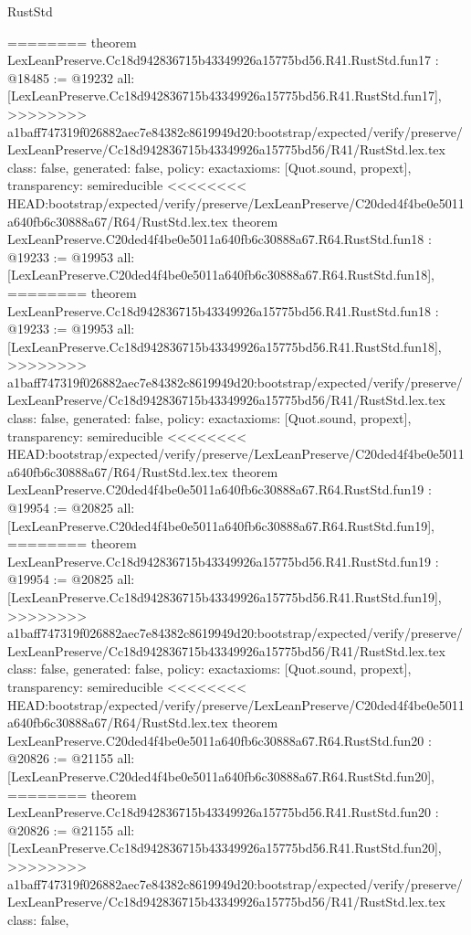 \begin{lexlean}{RustStd}
\begin{coremodule}
{\begin{coremodule}
{{{{{{{{{{{{{{{{{{{{========
theorem LexLeanPreserve.Cc18d942836715b43349926a15775bd56.R41.RustStd.fun17 : @18485 := @19232 {
  all: [LexLeanPreserve.Cc18d942836715b43349926a15775bd56.R41.RustStd.fun17],
>>>>>>>> a1baff747319f026882aec7e84382c8619949d20:bootstrap/expected/verify/preserve/LexLeanPreserve/Cc18d942836715b43349926a15775bd56/R41/RustStd.lex.tex
  class: false,
  generated: false,
  policy: exact{axioms: [Quot.sound, propext]},
  transparency: semireducible
}
<<<<<<<< HEAD:bootstrap/expected/verify/preserve/LexLeanPreserve/C20ded4f4be0e5011a640fb6c30888a67/R64/RustStd.lex.tex
theorem LexLeanPreserve.C20ded4f4be0e5011a640fb6c30888a67.R64.RustStd.fun18 : @19233 := @19953 {
  all: [LexLeanPreserve.C20ded4f4be0e5011a640fb6c30888a67.R64.RustStd.fun18],
========
theorem LexLeanPreserve.Cc18d942836715b43349926a15775bd56.R41.RustStd.fun18 : @19233 := @19953 {
  all: [LexLeanPreserve.Cc18d942836715b43349926a15775bd56.R41.RustStd.fun18],
>>>>>>>> a1baff747319f026882aec7e84382c8619949d20:bootstrap/expected/verify/preserve/LexLeanPreserve/Cc18d942836715b43349926a15775bd56/R41/RustStd.lex.tex
  class: false,
  generated: false,
  policy: exact{axioms: [Quot.sound, propext]},
  transparency: semireducible
}
<<<<<<<< HEAD:bootstrap/expected/verify/preserve/LexLeanPreserve/C20ded4f4be0e5011a640fb6c30888a67/R64/RustStd.lex.tex
theorem LexLeanPreserve.C20ded4f4be0e5011a640fb6c30888a67.R64.RustStd.fun19 : @19954 := @20825 {
  all: [LexLeanPreserve.C20ded4f4be0e5011a640fb6c30888a67.R64.RustStd.fun19],
========
theorem LexLeanPreserve.Cc18d942836715b43349926a15775bd56.R41.RustStd.fun19 : @19954 := @20825 {
  all: [LexLeanPreserve.Cc18d942836715b43349926a15775bd56.R41.RustStd.fun19],
>>>>>>>> a1baff747319f026882aec7e84382c8619949d20:bootstrap/expected/verify/preserve/LexLeanPreserve/Cc18d942836715b43349926a15775bd56/R41/RustStd.lex.tex
  class: false,
  generated: false,
  policy: exact{axioms: [Quot.sound, propext]},
  transparency: semireducible
}
<<<<<<<< HEAD:bootstrap/expected/verify/preserve/LexLeanPreserve/C20ded4f4be0e5011a640fb6c30888a67/R64/RustStd.lex.tex
theorem LexLeanPreserve.C20ded4f4be0e5011a640fb6c30888a67.R64.RustStd.fun20 : @20826 := @21155 {
  all: [LexLeanPreserve.C20ded4f4be0e5011a640fb6c30888a67.R64.RustStd.fun20],
========
theorem LexLeanPreserve.Cc18d942836715b43349926a15775bd56.R41.RustStd.fun20 : @20826 := @21155 {
  all: [LexLeanPreserve.Cc18d942836715b43349926a15775bd56.R41.RustStd.fun20],
>>>>>>>> a1baff747319f026882aec7e84382c8619949d20:bootstrap/expected/verify/preserve/LexLeanPreserve/Cc18d942836715b43349926a15775bd56/R41/RustStd.lex.tex
  class: false,
}}}}}}}}}}}}}}}}}}}}}}}}
\end{coremodule}}
\end{coremodule}
\end{lexlean}
